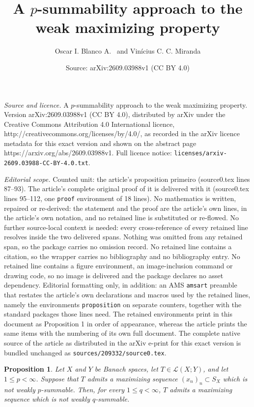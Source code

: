 \documentclass[10pt,a4paper]{amsart}
\title{A $p$-summability approach to the weak maximizing property}
\author{Oscar I. Blanco A. \, and Vinícius C. C. Miranda}
\date{Source: arXiv:2609.03988v1 (CC BY 4.0)}
\newtheorem{proposition}{Proposition}
\begin{document}
\maketitle

\noindent\emph{Source and licence.} A $p$-summability approach to the weak maximizing property. Version arXiv:2609.03988v1 (CC BY 4.0), distributed by arXiv under the Creative Commons Attribution 4.0 International licence, http://creativecommons.org/licenses/by/4.0/, as recorded in the arXiv licence metadata for this exact version and shown on the abstract page https://arxiv.org/abs/2609.03988v1. Full licence notice: \texttt{licenses/arxiv-2609.03988-CC-BY-4.0.txt}.\par\smallskip

\noindent\textit{Editorial scope.} Counted unit: the article's proposition primeiro (source0.tex lines 87--93). The article's complete original proof of it is delivered with it (source0.tex lines 95--112, one \texttt{proof} environment of 18 lines). No mathematics is written, repaired or re-derived: the statement and the proof are the article's own lines, in the article's own notation, and no retained line is substituted or re-flowed.  No further source-local context is needed: every cross-reference of every retained line resolves inside the two delivered spans.  Nothing was omitted from any retained span, so the package carries no omission record.  No retained line contains a citation, so the wrapper carries no bibliography and no bibliography entry.  No retained line contains a figure environment, an image-inclusion command or drawing code, so no image is delivered and the package declares no asset dependency.  Editorial formatting only, in addition: an AMS \texttt{amsart} preamble that restates the article's own declarations and macros used by the retained lines, namely the environments \texttt{proposition} on separate counters, together with the standard packages those lines need.  The retained environments print in this document as Proposition 1 in order of appearance, whereas the article prints the same items with the numbering of its own full document.  The complete native source of the article as distributed in the arXiv e-print for this exact version is bundled unchanged as \texttt{sources/209332/source0.tex}.
\begin{proposition}\label{primeiro}
Let $X$ and $Y$ be Banach spaces, let $T\in\mathcal L(X;Y)$, and let
$1\leq p<\infty$. Suppose that $T$ admits a maximizing sequence
$(x_n)_n\subset S_X$ which is not weakly $p$-summable. Then, for every
$1\leq q<\infty$, $T$ admits a maximizing sequence which is
not weakly $q$-summable.
\end{proposition}
\end{document}
